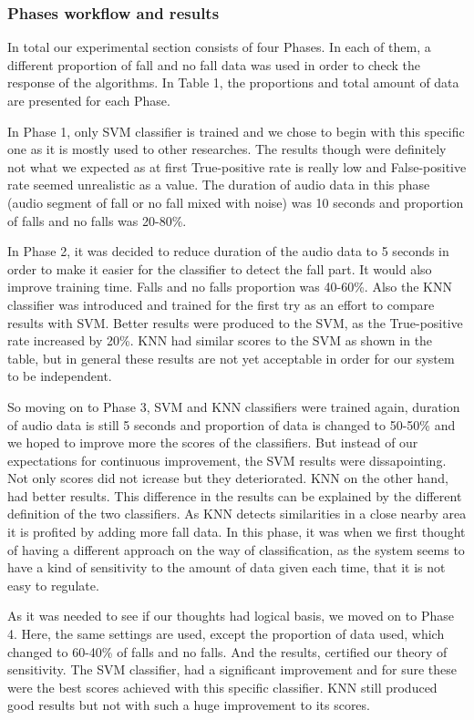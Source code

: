 \documentclass[10pt, conference, compsocconf]{IEEEtran}
\begin{document}
\subsubsection{Phases workflow and results}

In total our experimental section consists of four Phases. In each of them, a different proportion of fall and no fall data was used in order to check the response of the algorithms. In Table 1, the proportions and total amount of data are presented for each Phase. 

In Phase 1, only SVM classifier is trained and we chose to begin with this specific one as it is mostly used to other researches. The results though were definitely not what we expected as at first True-positive rate is really low and False-positive rate seemed unrealistic as a value. The duration of audio data in this phase (audio segment of fall or no fall mixed with noise) was 10 seconds and proportion of falls and no falls was 20-80\%. 

In Phase 2, it was decided to reduce duration of the audio data to 5 seconds in order to make it easier for the classifier to detect the fall part. It would also improve training time. Falls and no falls proportion was 40-60\%. Also the KNN classifier was introduced and trained for the first try as an effort to compare results with SVM. Better results were produced to the SVM, as the True-positive rate increased by 20\%. KNN had similar scores to the SVM as shown in the table, but in general these results are not yet acceptable in order for our system to be independent. 

So moving on to Phase 3, SVM and KNN classifiers were trained again, duration of audio data is still 5 seconds and proportion of data is changed to 50-50\% and we hoped to improve more the scores of the classifiers. But instead of our expectations for continuous improvement, the SVM results were dissapointing. Not only scores did not icrease but they deteriorated. KNN on the other hand, had better results. This difference in the results can be explained by the different definition of the two classifiers. As KNN detects similarities in a close nearby area it is profited by adding more fall data. In this phase, it was when we first thought of having a different approach on the way of classification, as the system seems to have a kind of sensitivity to the amount of data given each time, that it is not easy to regulate. 

As it was needed to see if our thoughts had logical basis, we moved on to Phase 4. Here, the same settings are used, except the proportion of data used, which changed to 60-40\% of falls and no falls. And the results, certified our theory of sensitivity. The SVM classifier, had a significant improvement and for sure these were the best scores achieved with this specific classifier. KNN still produced good results but not with such a huge improvement to its scores. 
\end{document}
